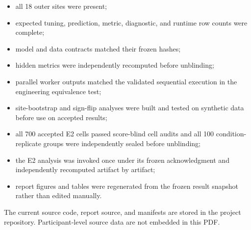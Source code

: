 \documentclass[11pt,a4paper]{article}
\begin{document}
\begin{itemize}
  \item all 18 outer sites were present;
  \item expected tuning, prediction, metric, diagnostic, and runtime row counts
  were complete;
  \item model and data contracts matched their frozen hashes;
  \item hidden metrics were independently recomputed before unblinding;
  \item parallel worker outputs matched the validated sequential execution in
  the engineering equivalence test;
  \item site-bootstrap and sign-flip analyses were built and tested on
  synthetic data before use on accepted results;
  \item all 700 accepted E2 cells passed score-blind cell audits and all 100
  condition-replicate groups were independently sealed before unblinding;
  \item the E2 analysis was invoked once under its frozen acknowledgment and
  independently recomputed artifact by artifact;
  \item report figures and tables were regenerated from the frozen result
  snapshot rather than edited manually.
\end{itemize}

The current source code, report source, and manifests are stored in
the project repository. Participant-level source data are not embedded in this
PDF.

\clearpage
\begin{singlespace}


\end{singlespace}
\end{document}
